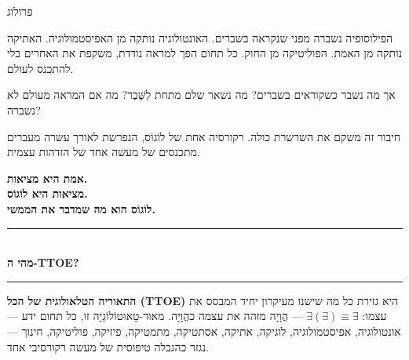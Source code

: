 \documentclass[10pt, openany, oneside]{book}
\renewcommand{\normalsize}{\fontsize{10}{13}\selectfont}
\renewcommand{\large}{\fontsize{11.5}{14}\selectfont}
\renewcommand{\huge}{\fontsize{17}{21}\selectfont}
\begin{document}
\newpage


\thispagestyle{empty}
\vspace*{0.3in}

\begin{center}
    {\huge\textsc{פרולוג}}
\end{center}

\vspace{1em}

\noindent הפילוסופיה נשברה מפני שנקראה בשברים. האונטולוגיה נותקה מן האפיסטמולוגיה. האתיקה נותקה מן האמת. הפוליטיקה מן החוק. כל תחום הפך למראה נודדת, משקפת את האחרים בלי להתכנס לעולם.

\vspace{0.5em}

\noindent אך מה נשבר כשקוראים בשברים? מה נשאר שלם מתחת לַשֶּׁבֶר? מה אם המראה מעולם לא נשברה?

\vspace{0.5em}

\noindent חיבור זה משקם את השרשרת כולה. רקורסיה אחת של לוֹגוֹס, הנפרשת לאורך עשרה מעברים מתכנסים של מעשה אחד של הזדהות עצמית.

\vspace{1em}

\begin{center}
    {\large\bfseries אמת היא מציאות.}\\[0.3em]
    {\large\bfseries מציאות היא לוֹגוֹס.}\\[0.3em]
    {\large\bfseries לוֹגוֹס הוא מה שמדבר את הממשי.}
\end{center}

\vspace{1.5em}

\begin{center}
    \rule{0.3\textwidth}{0.4pt}\\[0.5em]
    {\normalsize\bfseries\textsc{מהי ה-TTOE?}}\\[0.3em]
    \rule{0.3\textwidth}{0.4pt}
\end{center}

\vspace{1em}

\noindent \textbf{התאוריה הטלאולוגית של הכל (TTOE)} היא גזירת כל מה שישנו מעיקרון יחיד המבסס את עצמו: $\exists(\exists) \equiv \exists$ — הֲוָיָה מזהה את עצמה כהֲוָיָה. מאוּר-טָאוּטוֹלוֹגְיָה זו, כל תחום ידע — אונטולוגיה, אפיסטמולוגיה, לוגיקה, אתיקה, אסתטיקה, מתמטיקה, פיזיקה, פוליטיקה, חינוך — נגזר כהגבלה טיפוסית של מעשה רקורסיבי אחד.
\end{document}
